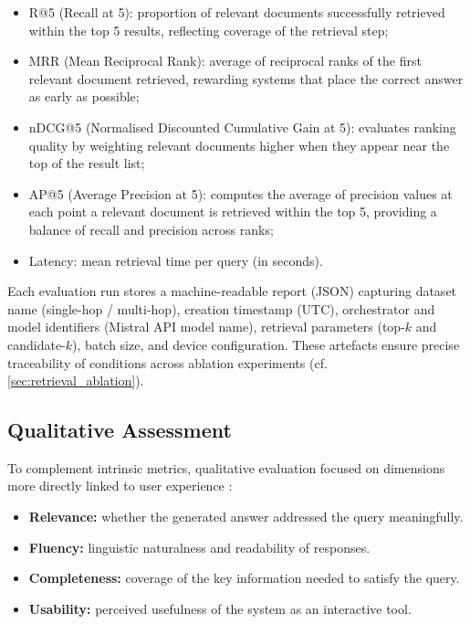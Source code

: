 \begin{spacing}{1.5}
\begin{itemize}
    \item R@5 (Recall at 5): proportion of relevant documents successfully retrieved within the top 5 results, reflecting coverage of the retrieval step;
    \item MRR (Mean Reciprocal Rank): average of reciprocal ranks of the first relevant document retrieved, rewarding systems that place the correct answer as early as possible;
    \item nDCG@5 (Normalised Discounted Cumulative Gain at 5): evaluates ranking quality by weighting relevant documents higher when they appear near the top of the result list;
    \item AP@5 (Average Precision at 5): computes the average of precision values at each point a relevant document is retrieved within the top 5, providing a balance of recall and precision across ranks;
    \item Latency: mean retrieval time per query (in seconds).
\end{itemize}

Each evaluation run stores a machine-readable report (JSON) capturing dataset name (single-hop / multi-hop), creation timestamp (UTC), orchestrator and model identifiers (Mistral API model name), retrieval parameters (top-$k$ and candidate-$k$), batch size, and device configuration. These artefacts ensure precise traceability of conditions across ablation experiments (cf. \autoref{sec:retrieval_ablation}).

\subsection{Qualitative Assessment}
To complement intrinsic metrics, qualitative evaluation focused on dimensions more directly linked to user experience \citep{bronsdon_understanding_2025}:
\begin{itemize}
      \item \textbf{Relevance:} whether the generated answer addressed the query meaningfully.
      \item \textbf{Fluency:} linguistic naturalness and readability of responses.
      \item \textbf{Completeness:} coverage of the key information needed to satisfy the query.
      \item \textbf{Usability:} perceived usefulness of the system as an interactive tool.
\end{itemize}


\end{spacing}
